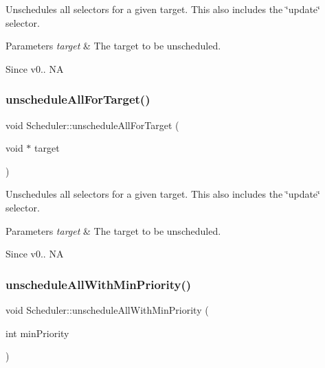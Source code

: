 Unschedules all selectors for a given target. This also includes the \char`\"{}update\char`\"{} selector. 
\begin{DoxyParams}{Parameters}
{\em target} & The target to be unscheduled. \\
\hline
\end{DoxyParams}
\begin{DoxySince}{Since}
v0..  NA 
\end{DoxySince}
\mbox{\label{classScheduler_a39199385fc1ab4f74c5665beaa2738b6}} 
\subsubsection{\texorpdfstring{unschedule\+All\+For\+Target()}{unscheduleAllForTarget()}\hspace{0.1cm}{\footnotesize\ttfamily [2/2]}}
{\footnotesize\ttfamily void Scheduler\+::unschedule\+All\+For\+Target (\begin{DoxyParamCaption}\item[{void $\ast$}]{target }\end{DoxyParamCaption})}

Unschedules all selectors for a given target. This also includes the \char`\"{}update\char`\"{} selector. 
\begin{DoxyParams}{Parameters}
{\em target} & The target to be unscheduled. \\
\hline
\end{DoxyParams}
\begin{DoxySince}{Since}
v0..  NA 
\end{DoxySince}
\mbox{\label{classScheduler_aa846e95ed320bdac9ca2c91a0d7e79db}} 
\subsubsection{\texorpdfstring{unschedule\+All\+With\+Min\+Priority()}{unscheduleAllWithMinPriority()}\hspace{0.1cm}{\footnotesize\ttfamily [1/2]}}
{\footnotesize\ttfamily void Scheduler\+::unschedule\+All\+With\+Min\+Priority (\begin{DoxyParamCaption}\item[{int}]{min\+Priority }\end{DoxyParamCaption})}

